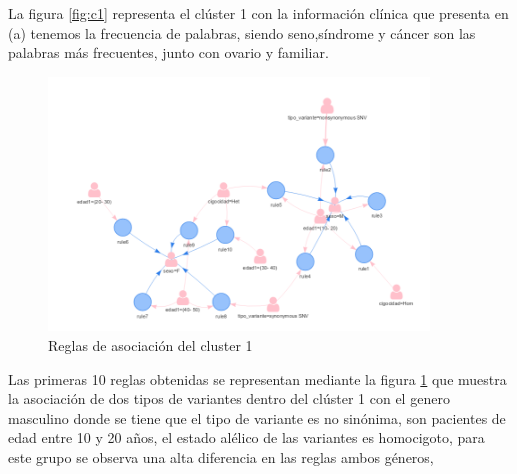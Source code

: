 La figura \ref{fig:c1} representa el clúster 1 con la información clínica que presenta en (a) tenemos la frecuencia de palabras, siendo seno,síndrome y cáncer son las palabras más frecuentes, junto con ovario y familiar.

\begin{figure}[H]
	\centering
	\includegraphics[width=0.9\textwidth]{Kap4/reglasc1}
	\caption{Reglas de asociación del cluster 1} \label{fig:reglas}
\end{figure}

Las primeras 10 reglas obtenidas se representan mediante la figura \ref{fig:reglas} que muestra la asociación de dos tipos de variantes dentro del clúster 1 con el genero masculino donde se tiene que el tipo de variante es no sinónima, son pacientes de edad entre 10 y 20 años, el estado alélico de las variantes es homocigoto, para este grupo se observa una alta diferencia en las reglas ambos géneros, 


